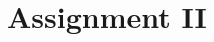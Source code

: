\documentclass[12pt]{article}
\begin{document}


\section{Assignment II}
\label{sec:assignment2}


\end{document}
